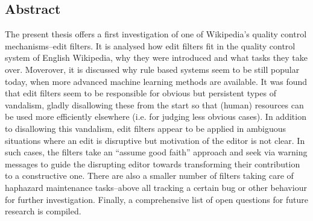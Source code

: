 %
\pagestyle{empty}

\subsection*{Abstract}

The present thesis offers a first investigation of one of Wikipedia's quality control mechanisms–edit filters.
It is analysed how edit filters fit in the quality control system of English Wikipedia, why they were introduced and what tasks they take over.
Moverover, it is discussed why rule based systems seem to be still popular today, when more advanced machine learning methods are available.
It was found that edit filters seem to be responsible for obvious but persistent types of vandalism, gladly disallowing these from the start so that (human) resources can be used more efficiently elsewhere (i.e. for judging less obvious cases).
In addition to disallowing this vandalism, edit filters appear to be applied in ambiguous situations where an edit is disruptive but motivation of the editor is not clear.
In such cases, the filters take an ``assume good faith'' approach and seek via warning messages to guide the disrupting editor towards transforming their contribution to a constructive one.
There are also a smaller number of filters taking care of haphazard maintenance tasks–above all tracking a certain bug or other behaviour for further investigation.
Finally, a comprehensive list of open questions for future research is compiled.

\begin{comment}
Include
- the topic of this thesis,
- important contents,
- results of your research
- and an evaluation of your results.
\end{comment}

\cleardoublepage
